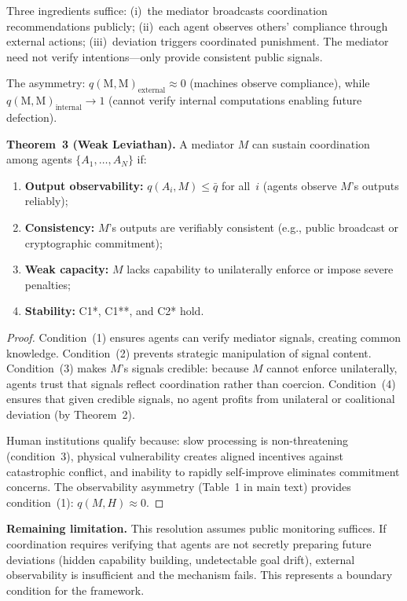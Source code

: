 \documentclass[11pt]{article}
\begin{document}
Three ingredients suffice: (i)~the mediator broadcasts coordination recommendations publicly; (ii)~each agent observes others' compliance through external actions; (iii)~deviation triggers coordinated punishment. The mediator need not verify intentions---only provide consistent public signals.

The asymmetry: $q(\text{M},\text{M})_{\text{external}} \approx 0$ (machines observe compliance), while $q(\text{M},\text{M})_{\text{internal}} \to 1$ (cannot verify internal computations enabling future defection).

\textbf{Theorem~3 (Weak Leviathan).} A mediator $M$ can sustain coordination among agents $\{A_1, \ldots, A_N\}$ if:
\begin{enumerate}
\item \textbf{Output observability:} $q(A_i, M) \leq \bar{q}$ for all~$i$ (agents observe $M$'s outputs reliably);
\item \textbf{Consistency:} $M$'s outputs are verifiably consistent (e.g., public broadcast or cryptographic commitment);
\item \textbf{Weak capacity:} $M$ lacks capability to unilaterally enforce or impose severe penalties;
\item \textbf{Stability:} C1*, C1**, and C2* hold.
\end{enumerate}

\begin{proof}
Condition~(1) ensures agents can verify mediator signals, creating common knowledge. Condition~(2) prevents strategic manipulation of signal content. Condition~(3) makes $M$'s signals credible: because $M$ cannot enforce unilaterally, agents trust that signals reflect coordination rather than coercion. Condition~(4) ensures that given credible signals, no agent profits from unilateral or coalitional deviation (by Theorem~2).

Human institutions qualify because: slow processing is non-threatening (condition~3), physical vulnerability creates aligned incentives against catastrophic conflict, and inability to rapidly self-improve eliminates commitment concerns. The observability asymmetry (Table~1 in main text) provides condition~(1): $q(M,H) \approx 0$.
\end{proof}

\textbf{Remaining limitation.} This resolution assumes public monitoring suffices. If coordination requires verifying that agents are not secretly preparing future deviations (hidden capability building, undetectable goal drift), external observability is insufficient and the mechanism fails. This represents a boundary condition for the framework.
\end{document}
